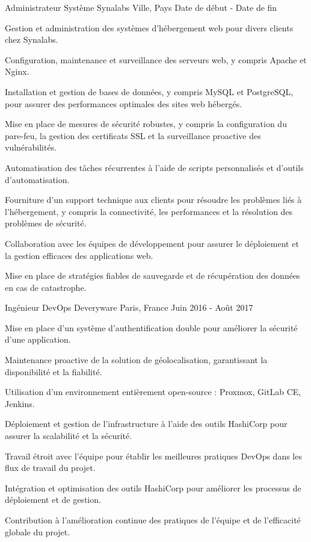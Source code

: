 \begin{cventries}
\cventry
{Administrateur Système} %
{Synalabs} %
{Ville, Pays} %
{Date de début - Date de fin} %
{
  \begin{cvitems} %
    \item {Gestion et administration des systèmes d'hébergement web pour divers clients chez Synalabs.}
    \item {Configuration, maintenance et surveillance des serveurs web, y compris Apache et Nginx.}
    \item {Installation et gestion de bases de données, y compris MySQL et PostgreSQL, pour assurer des performances optimales des sites web hébergés.}
    \item {Mise en place de mesures de sécurité robustes, y compris la configuration du pare-feu, la gestion des certificats SSL et la surveillance proactive des vulnérabilités.}
    \item {Automatisation des tâches récurrentes à l'aide de scripts personnalisés et d'outils d'automatisation.}
    \item {Fourniture d'un support technique aux clients pour résoudre les problèmes liés à l'hébergement, y compris la connectivité, les performances et la résolution des problèmes de sécurité.}
    \item {Collaboration avec les équipes de développement pour assurer le déploiement et la gestion efficaces des applications web.}
    \item {Mise en place de stratégies fiables de sauvegarde et de récupération des données en cas de catastrophe.}
  \end{cvitems}
}

\cventry
{Ingénieur DevOps} %
{Deveryware} %
{Paris, France} %
{Juin 2016 - Août 2017} %
{
  \begin{cvitems} %
    \item {Mise en place d'un système d'authentification double pour améliorer la sécurité d'une application.}
    \item {Maintenance proactive de la solution de géolocalisation, garantissant la disponibilité et la fiabilité.}
    \item {Utilisation d'un environnement entièrement open-source : Proxmox, GitLab CE, Jenkins.}
    \item {Déploiement et gestion de l'infrastructure à l'aide des outils HashiCorp pour assurer la scalabilité et la sécurité.}
    \item {Travail étroit avec l'équipe pour établir les meilleures pratiques DevOps dans les flux de travail du projet.}
    \item {Intégration et optimisation des outils HashiCorp pour améliorer les processus de déploiement et de gestion.}
    \item {Contribution à l'amélioration continue des pratiques de l'équipe et de l'efficacité globale du projet.}
  \end{cvitems}
}


\end{cventries}
